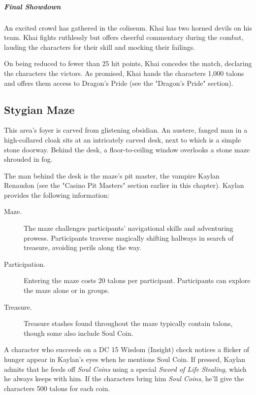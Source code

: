 \documentclass[10pt,a4paper,twoside,bg=print,twocolumn,openany,nodeprecatedcode]{dndbook}
\begin{document}
\subparagraph{Final Showdown}
An excited crowd has gathered in the coliseum. Khai has two horned devils on his team. Khai fights ruthlessly but offers cheerful commentary during the combat, lauding the characters for their skill and mocking their failings.

On being reduced to fewer than 25 hit points, Khai concedes the match, declaring the characters the victors. As promised, Khai hands the characters 1,000 talons and offers them access to Dragon's Pride (see the "Dragon's Pride" section).

\subsection{Stygian Maze}
\begin{DndReadAloud}{}
This area's foyer is carved from glistening obsidian. An austere, fanged man in a high-collared cloak sits at an intricately carved desk, next to which is a simple stone doorway. Behind the desk, a floor-to-ceiling window overlooks a stone maze shrouded in fog.

\end{DndReadAloud}

The man behind the desk is the maze's pit master, the vampire Kaylan Renaudon (see the "Casino Pit Masters" section earlier in this chapter). Kaylan provides the following information:


\begin{description}
\item[Maze.]
The maze challenges participants' navigational skills and adventuring prowess. Participants traverse magically shifting hallways in search of treasure, avoiding perils along the way.
\item[Participation.]
Entering the maze costs 20 talons per participant. Participants can explore the maze alone or in groups.
\item[Treasure.]
Treasure stashes found throughout the maze typically contain talons, though some also include Soul Coin.
\end{description}

A character who succeeds on a DC 15 Wisdom (Insight) check notices a flicker of hunger appear in Kaylan's eyes when he mentions Soul Coin. If pressed, Kaylan admits that he feeds off \textit{Soul Coins} using a special \textit{Sword of Life Stealing}, which he always keeps with him. If the characters bring him \textit{Soul Coins}, he'll give the characters 500 talons for each coin.
\end{document}
